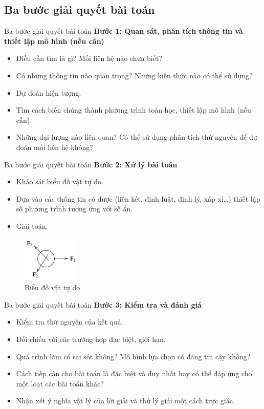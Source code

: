 \subsection{Ba bước giải quyết bài toán}
\begin{frame}{Ba bước giải quyết bài toán}
  \textbf{Bước 1: Quan sát, phân tích thông tin và thiết lập mô hình (nếu cần)}
    \begin{itemize}
        \item Điều cần tìm là gì? Mối liên hệ nào chưa biết?
        \item Có những thông tin nào quan trọng? Những kiến thức nào có thể sử dụng?
        \item Dự đoán hiện tượng.
        \item Tìm cách biến chúng thành phương trình toán học, thiết lập mô hình (nếu cần).
        \item Những đại lượng nào liên quan? Có thể sử dụng phân tích thứ nguyên để dự đoán mối liên hệ không?
  \end{itemize}
\end{frame}

\begin{frame}{Ba bước giải quyết bài toán}
  \textbf{Bước 2: Xử lý bài toán}
    \begin{itemize}
        \item Khảo sát biểu đồ vật tự do.
        \item Dựa vào các thông tin có được (liên kết, định luật, định lý, xấp xỉ…) thiết lập số phương trình tương ứng với số ẩn.
        \item Giải toán.
    \end{itemize}
    \begin{figure}
        \centering
        \includegraphics[width=0.25\textwidth]{Slides/Figure/fbd.png}
        \caption{Biểu đồ vật tự do}
    \end{figure}
\end{frame}

\begin{frame}{Ba bước giải quyết bài toán}
  \textbf{Bước 3: Kiểm tra và đánh giá}
    \begin{itemize}
        \item Kiểm tra thứ nguyên của kết quả.
        \item Đối chiếu với các trường hợp đặc biệt, giới hạn.
        \item Quá trình làm có sai sót không? Mô hình lựa chọn có đáng tin cậy không?
        \item Cách tiếp cận cho bài toán là đặc biệt và duy nhất hay có thể đáp ứng cho một loạt các bài toán khác?
        \item Nhận xét ý nghĩa vật lý của lời giải và thử lý giải một cách trực giác.
    \end{itemize}
\end{frame}


